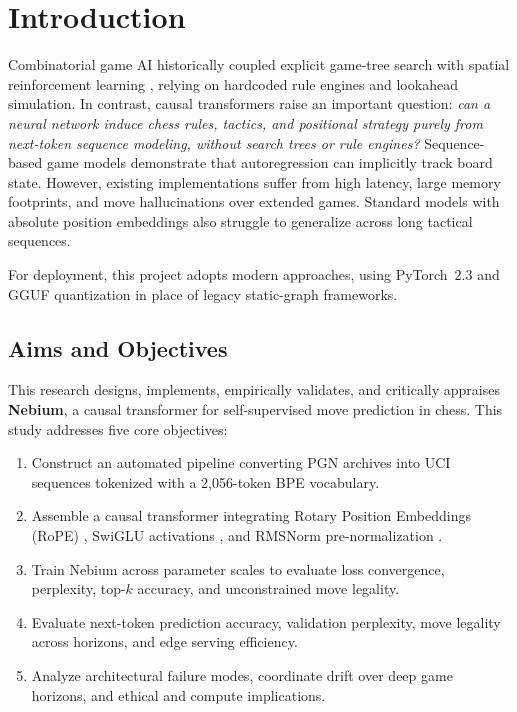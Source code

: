 \section{Introduction}
\label{sec:introduction}

Combinatorial game AI historically coupled explicit game-tree search with spatial reinforcement learning \parencite{silver2018general,stockfish2023}, relying on hardcoded rule engines and lookahead simulation. In contrast, causal transformers \parencite{vaswani2017attention} raise an important question: \textit{can a neural network induce chess rules, tactics, and positional strategy purely from next-token sequence modeling, without search trees or rule engines?} Sequence-based game models \parencite{Toshniwal2021ChessAA,li2023emergent,ruoss2024amortized} demonstrate that autoregression can implicitly track board state. However, existing implementations suffer from high latency, large memory footprints, and move hallucinations over extended games. Standard models with absolute position embeddings also struggle to generalize across long tactical sequences.

For deployment, this project adopts modern approaches, using PyTorch~2.3 \parencite{paszke2019pytorch} and GGUF quantization \parencite{gerganov2023llamacpp} in place of legacy static-graph frameworks.

\subsection{Aims and Objectives}
\label{sec:intro_aims}
This research designs, implements, empirically validates, and critically appraises \textbf{Nebium}, a causal transformer for self-supervised move prediction in chess. This study addresses five core objectives:
\begin{enumerate}
    \item Construct an automated pipeline converting PGN archives into UCI sequences tokenized with a 2,056-token BPE vocabulary.
    \item Assemble a causal transformer integrating Rotary Position Embeddings (RoPE) \parencite{su2024roformer}, SwiGLU activations \parencite{shazeer2020glu}, and RMSNorm pre-normalization \parencite{zhang2019root}.
    \item Train Nebium across parameter scales to evaluate loss convergence, perplexity, top-$k$ accuracy, and unconstrained move legality.
    \item Evaluate next-token prediction accuracy, validation perplexity, move legality across horizons, and edge serving efficiency.
    \item Analyze architectural failure modes, coordinate drift over deep game horizons, and ethical and compute implications.
\end{enumerate}

